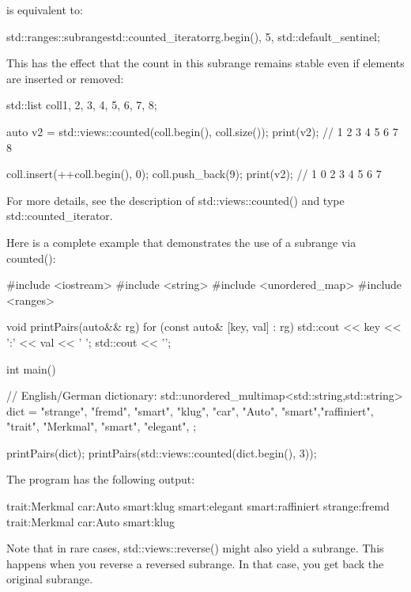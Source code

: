 is equivalent to:


\begin{cpp}
std::ranges::subrange{std::counted_iterator{rg.begin(), 5},
	std::default_sentinel};
\end{cpp}

This has the effect that the count in this subrange remains stable even if elements are inserted or removed:

\begin{cpp}
std::list coll{1, 2, 3, 4, 5, 6, 7, 8};

auto v2 = std::views::counted(coll.begin(), coll.size());
print(v2); // 1 2 3 4 5 6 7 8

coll.insert(++coll.begin(), 0);
coll.push_back(9);
print(v2); // 1 0 2 3 4 5 6 7
\end{cpp}

For more details, see the description of std::views::counted() and type std::counted\_iterator.

Here is a complete example that demonstrates the use of a subrange via counted():


\begin{cpp}
#include <iostream>
#include <string>
#include <unordered_map>
#include <ranges>

void printPairs(auto&& rg)
{
	for (const auto& [key, val] : rg) {
		std::cout << key << ':' << val << ' ';
	}
	std::cout << '\n';
}

int main()
{
	// English/German dictionary:
	std::unordered_multimap<std::string,std::string> dict = {
		{"strange", "fremd"},
		{"smart", "klug"},
		{"car", "Auto"},
		{"smart","raffiniert"},
		{"trait", "Merkmal"},
		{"smart", "elegant"},
	};
	
	printPairs(dict);
	printPairs(std::views::counted(dict.begin(), 3));
}
\end{cpp}

The program has the following output:

\begin{shell}
trait:Merkmal car:Auto smart:klug smart:elegant smart:raffiniert strange:fremd
trait:Merkmal car:Auto smart:klug
\end{shell}

Note that in rare cases, std::views::reverse() might also yield a subrange. This happens when you reverse a reversed subrange. In that case, you get back the original subrange.




